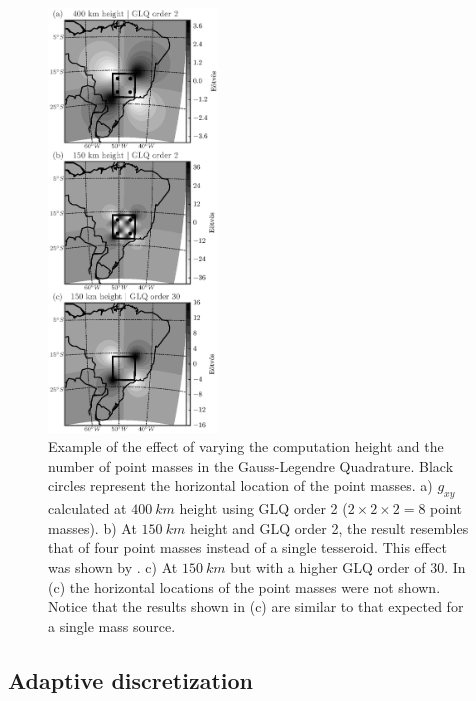 \documentclass[paper,twocolumn,twoside]{geophysics}
\begin{document}
\begin{figure}
    \centering
    \includegraphics[width=0.4\textwidth]{figs/vary-height-and-order}
    \caption{
        Example of the effect of varying
        the computation height
        and the number of point masses in the Gauss-Legendre Quadrature.
        Black circles represent the horizontal location of the point masses.
        a) $g_{xy}$ calculated at $400\ km$ height using GLQ order 2
        ($2 \times 2 \times 2 = 8$ point masses).
        b) At $150\ km$ height and GLQ order 2,
        the result resembles that of
        four point masses instead of a single tesseroid.
        This effect was shown by \citet{Ku1977}.
        c) At $150\ km$ but with a higher GLQ order of 30.
        In (c) the horizontal locations of the point masses were not shown.
        Notice that the results shown in (c) are similar to that expected
        for a single mass source.
    }
    \label{fig:glqerrorsample}
\end{figure}


\subsection{Adaptive discretization}
\end{document}
